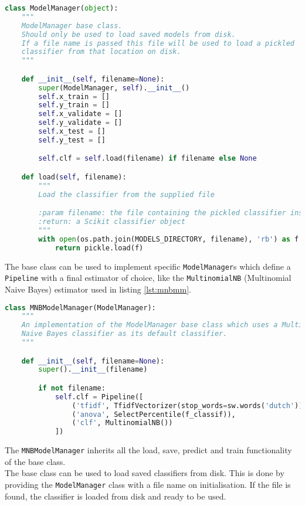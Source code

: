 \begin{lstlisting}[language=python, caption={ModelManager base class}, label={lst:modman}]
class ModelManager(object):
    """
    ModelManager base class.
    Should only be used to load saved models from disk.
    If a file name is passed this file will be used to load a pickled
    classifier from that location on disk.
    """

    def __init__(self, filename=None):
        super(ModelManager, self).__init__()
        self.x_train = []
        self.y_train = []
        self.x_validate = []
        self.y_validate = []
        self.x_test = []
        self.y_test = []

        self.clf = self.load(filename) if filename else None

    def load(self, filename):
        """
        Load the classifier from the supplied file

        :param filename: the file containing the pickled classifier instance
        :return: a Scikit classifier object
        """
        with open(os.path.join(MODELS_DIRECTORY, filename), 'rb') as f:
            return pickle.load(f)
\end{lstlisting}

The base class can be used to implement specific \texttt{ModelManager}s which define a \texttt{Pipeline} with a final estimator of choice, like the \texttt{MultinomialNB} (Multinomial Naive Bayes) estimator used in listing \ref{lst:mnbmm}.\\

\begin{lstlisting}[language=python, caption={ModelManager using the Multinomial Naive Bayes estimator}, label={lst:mnbmm}]
class MNBModelManager(ModelManager):
    """
    An implementation of the ModelManager base class which uses a Multinomial
    Naive Bayes classifier as its default classifier.
    """

    def __init__(self, filename=None):
        super().__init__(filename)

        if not filename:
            self.clf = Pipeline([
                ('tfidf', TfidfVectorizer(stop_words=sw.words('dutch'))),
                ('anova', SelectPercentile(f_classif)),
                ('clf', MultinomialNB())
            ])
\end{lstlisting}

The \texttt{MNBModelManager} inherits all the load, save, predict and train functionality of the base class.\\
The base class can be used to load saved classifiers from disk. This is done by providing the \texttt{ModelManager} class with a file name on initialisation. If the file is found, the classifier is loaded from disk and ready to be used.

